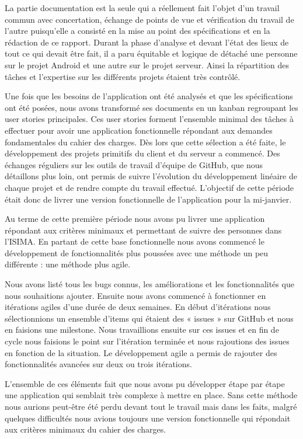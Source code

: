 La partie documentation est la seule qui a réellement fait l’objet d’un travail commun avec concertation, échange de points de vue et vérification du travail de l’autre puisqu’elle a consisté en la mise au point des spécifications et en la rédaction de ce rapport. Durant la phase d’analyse et devant l’état des lieux de tout ce qui devait être fait, il a paru équitable et logique de détaché une personne sur le projet Android et une autre sur le projet serveur. Ainsi la répartition des tâches et l’expertise sur les différents projets étaient très contrôlé.

Une fois que les besoins de l’application ont été analysés et que les spécifications ont été posées, nous avons transformé ses documents en un kanban regroupant les user stories principales. Ces user stories forment l’ensemble minimal des tâches à effectuer pour avoir une application fonctionnelle répondant aux demandes fondamentales du cahier des charges. Dès lors que cette sélection a été faite, le développement des projets primitifs du client et du serveur a commencé. Des échanges réguliers sur les outils de travail d’équipe de GitHub, que nous détaillons plus loin, ont permis de suivre l’évolution du développement linéaire de chaque projet et de rendre compte du travail effectué. L’objectif de cette période était donc de livrer une version fonctionnelle de l’application pour la mi-janvier.

Au terme de cette première période nous avons pu livrer une application répondant aux critères minimaux et permettant de suivre des personnes dans l’ISIMA. En partant de cette base fonctionnelle nous avons commencé le développement de fonctionnalités plus poussées avec une méthode un peu différente : une méthode plus agile.

Nous avons listé tous les bugs connus, les améliorations et les fonctionnalités que nous souhaitions ajouter. Ensuite nous avons commencé à fonctionner en itérations agiles d’une durée de deux semaines. En début d’itérations nous sélectionnions un ensemble d’items qui étaient des « issues » sur GitHub et nous en faisions une milestone. Nous travaillions ensuite sur ces issues et en fin de cycle nous faisions le point sur l’itération terminée et nous rajoutions des issues en fonction de la situation. Le développement agile a permis de rajouter des fonctionnalités avancées sur deux ou trois itérations.

L’ensemble de ces éléments fait que nous avons pu développer étape par étape une application qui semblait très complexe à mettre en place. Sans cette méthode nous aurions peut-être été perdu devant tout le travail mais dans les faits, malgré quelques difficultés nous avions toujours une version fonctionnelle qui répondait aux critères minimaux du cahier des charges.

